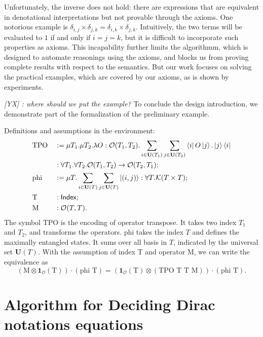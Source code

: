 \documentclass[runningheads]{llncs}
\newcommand{\yx}[1]{\textit{\color{blue}[YX] : #1}}
\begin{document}
Unfortunately, the inverse does not hold: there are expressions that are equivalent in denotational interpretations but not provable through the axioms.
One notorious example is $\delta_{i, j} \times \delta_{j, k} = \delta_{i, k} \times \delta_{j, k}$. Intuitively, the two terms will be evaluated to $1$ if and only if $i = j = k$, but it is difficult to incorporate such properties as axioms.
This incapability further limits the algorithmm, which is designed to automate reasonings using the axioms, and blocks us from proving complete results with respect to the semantics. But our work focuses on solving the practical examples, which are covered by our axioms, as is shown by experiments.


\yx{where should we put the example?}
To conclude the design introduction, we demonstrate part of the formalization of the preliminary example.
\begin{example}
    Definitions and assumptions in the environment:
    \begin{align*}
        & \textrm{TPO} && := \mu T_1. \mu T_2. \lambda O : \mathcal{O}(T_1, T_2). \sum_{i \in \mathbf{U}(T_1)} \sum_{j \in \mathbf{U}(T_2)} \bra{i} O \ket{j} . \ket{j}\bra{i} \\
        & && : \forall T_1. \forall T_2. \mathcal{O}(T_1, T_2) \to \mathcal{O}(T_2, T_1); \\
        & \textrm{phi} && := \mu T. \sum_{i \in \mathbf{U}(T)} \sum_{j \in \mathbf{U}(T)} \ket{(i, j)} : \forall T.\mathcal{K}(T \times T); \\
        & \textrm{T} && : \mathsf{Index}; \\
        & \textrm{M} && : \mathcal{O}(T, T).
    \end{align*}
    The symbol TPO is the encoding of operator transpose. It takes two index $T_1$ and $T_2$, and transforms the operators.
    phi takes the index $T$ and defines the maximally entangled states. It sums over all basis in $T$, indicated by the universal set $\mathbf{U}(T)$.
    With the assumption of index T and operator M, we can write the equivalence as 
    \[
        (\textrm{M} \otimes \mathbf{1}_\mathcal{O}(\textrm{T})) \cdot (\textrm{phi T}) = (\mathbf{1}_\mathcal{O}(\textrm{T}) \otimes (\textrm{TPO T T M})) \cdot (\textrm{phi T}).
    \]
\end{example}





\section{Algorithm for Deciding Dirac notations equations}
\end{document}
